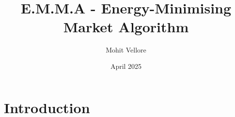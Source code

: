 \documentclass{article}
\title{E.M.M.A - Energy-Minimising Market Algorithm}
\author{Mohit Vellore}
\date{April 2025}
\begin{document}
\maketitle

\section{Introduction}
\end{document}
